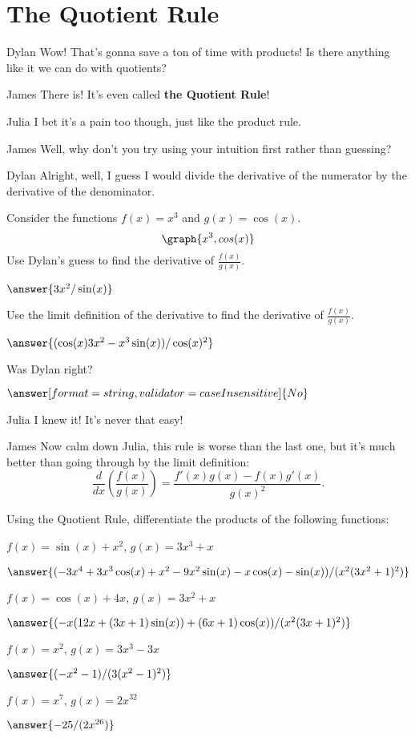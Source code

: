 \documentclass{ximera}
\begin{document}
\section{The Quotient Rule}
\begin{dialogue}
\item[Dylan] Wow! That's gonna save a ton of time with products! Is there anything like it we can do with quotients?
\item[James] There is! It's even called \textbf{the Quotient Rule}!
\item[Julia] I bet it's a pain too though, just like the product rule.
\item[James] Well, why don't you try using your intuition first rather than guessing?
\item[Dylan] Alright, well, I guess I would divide the derivative of the numerator by the derivative of the denominator.
\end{dialogue}
\begin{question}
Consider the functions $f(x) = x^3$ and $g(x) = \cos(x)$.
\[
\graph{x^3, cos(x)}
\]
Use Dylan's guess to find the derivative of $\frac{f(x)}{g(x)}$.

$\answer{3x^2/\sin(x)}$

Use the limit definition of the derivative to find the derivative of $\frac{f(x)}{g(x)}$.

$\answer{(\cos(x)3x^2-x^3\sin(x))/\cos(x)^2}$

Was Dylan right?

$\answer[format=string,validator=caseInsensitive]{No}$
\end{question}
\begin{dialogue}
\item[Julia] I knew it! It's never that easy!
\item[James] Now calm down Julia, this rule is worse than the last one, but it's much better than going through by the limit definition:  $$\frac{d}{dx}\left( \frac{f(x)}{g(x)}\right) = \frac{f'(x)g(x)-f(x)g'(x)}{g(x)^2}\text{.}$$
\end{dialogue}
\begin{question}
Using the Quotient Rule, differentiate the products of the following functions:

$f(x) = \sin(x)+x^2$, $g(x) = 3x^3+x$

$\answer{(-3x^4+3x^3\cos(x)+x^2-9x^2\sin(x)-x\cos(x)-\sin(x))/(x^2(3x^2+1)^2)}$

$f(x) = \cos(x)+4x$, $g(x) = 3x^2+x$

$\answer{(-x(12x+(3x+1)\sin(x))+(6x+1)\cos(x))/(x^2(3x+1)^2)}$

$f(x) = x^2$, $g(x) = 3x^3-3x$

$\answer{(-x^2-1)/(3(x^2-1)^2)}$

$f(x) = x^7$, $g(x) = 2x^{32}$

$\answer{-25/(2x^{26})}$
\end{question}
\end{document}
